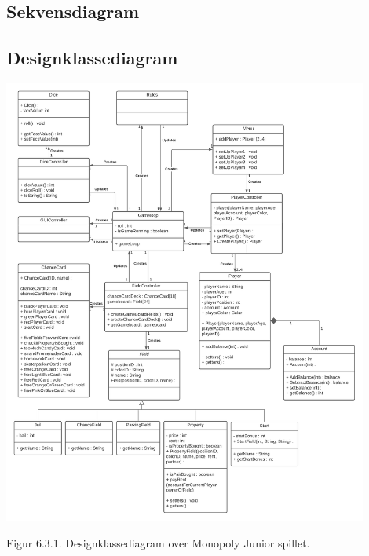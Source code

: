 \begin{flushleft}

\subsection{Sekvensdiagram}

\subsection{Designklassediagram}
\begin{center}
\includegraphics[width=0.9\textwidth]{Report/figures/Class Diagram.png}~\\[1cm]
\end{center}
Figur 6.3.1. Designklassediagram over Monopoly Junior spillet.
\end{flushleft}